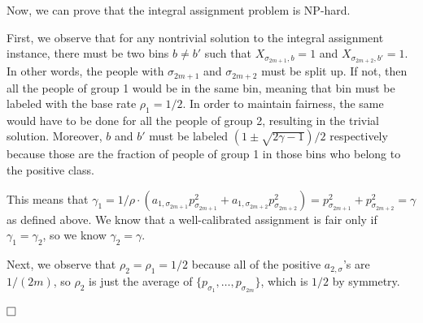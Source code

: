 \documentclass[11pt]{article}
\def\squarebox#1{\hbox to #1{\hfill\vbox to #1{\vfill}}}
\newcommand{\qed}{\hspace*{\fill}\vbox{\hrule\hbox{\vrule\squarebox{.667em}\vrule}\hrule}\smallskip}
\newenvironment{proof}{\noindent{\bf Proof:~~}}{\(\qed\)}
\begin{document}
Now, we can prove that the integral assignment problem is NP-hard.

\begin{proof}
  First, we observe that for any nontrivial solution to the integral assignment
  instance, there must be two bins $b \ne b'$ such that $X_{\sigma_{2m+1},b} =
  1$ and $X_{\sigma_{2m+2},b'} = 1$. In other words, the people with
  $\sigma_{2m+1}$ and $\sigma_{2m+2}$ must be split up. If not, then all the
  people of group 1 would be in the same bin, meaning that bin must be labeled
  with the base rate $\rho_1 = 1/2$. In order to maintain fairness, the same
  would have to be done for all the people of group 2, resulting in the trivial
  solution. Moreover, $b$ and $b'$ must be labeled $(1 \pm \sqrt{2\gamma-1})/2$
  respectively because those are the fraction of people of group 1 in those bins
  who belong to the positive class.

  This means that $\gamma_1 = 1/\rho \cdot (a_{1,\sigma_{2m+1}}
  p_{\sigma_{2m+1}}^2 + a_{1,\sigma_{2m+2}} p_{\sigma_{2m+2}}^2) =
  p_{\sigma_{2m+1}}^2 + p_{\sigma_{2m+2}}^2 = \gamma$ as defined above. We know
  that a well-calibrated assignment is fair only if $\gamma_1 =
  \gamma_2$, so we know $\gamma_2 = \gamma$.

  Next, we observe that $\rho_2 = \rho_1 = 1/2$ because all of the positive
  $a_{2,\sigma}$'s are $1/(2m)$, so $\rho_2$ is just the average of
  $\{p_{\sigma_1}, \dots, p_{\sigma_{2m}}\}$, which is $1/2$ by symmetry.


\end{proof}
\end{document}
